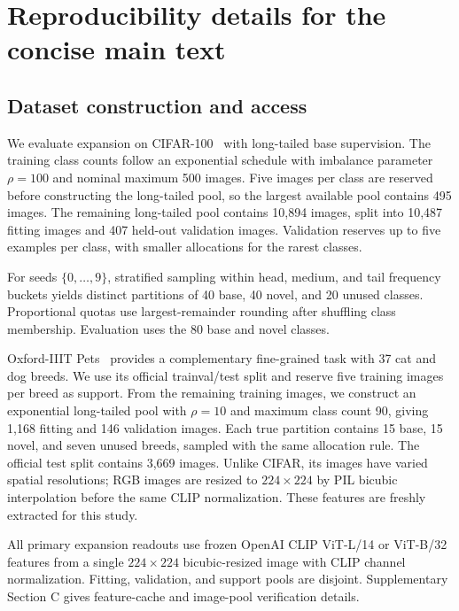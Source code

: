 \documentclass[preprint,review,12pt]{elsarticle}
\begin{document}
\FloatBarrier
\section{Reproducibility details for the concise main text}
\label{app:concisedetails}
\subsection{Dataset construction and access}

We evaluate expansion on CIFAR-100~\cite{krizhevsky2009cifar} with long-tailed base supervision. The training class counts follow an exponential schedule with imbalance parameter $\rho=100$ and nominal maximum 500 images. Five images per class are reserved before constructing the long-tailed pool, so the largest available pool contains 495 images. The remaining long-tailed pool contains 10,894 images, split into 10,487 fitting images and 407 held-out validation images. Validation reserves up to five examples per class, with smaller allocations for the rarest classes.

For seeds $\{0,\ldots,9\}$, stratified sampling within head, medium, and tail frequency buckets yields distinct partitions of 40 base, 40 novel, and 20 unused classes. Proportional quotas use largest-remainder rounding after shuffling class membership. Evaluation uses the 80 base and novel classes.

Oxford-IIIT Pets~\cite{parkhi2012cats} provides a complementary fine-grained task with 37 cat and dog breeds. We use its official trainval/test split and reserve five training images per breed as support. From the remaining training images, we construct an exponential long-tailed pool with $\rho=10$ and maximum class count 90, giving 1,168 fitting and 146 validation images. Each true partition contains 15 base, 15 novel, and seven unused breeds, sampled with the same allocation rule. The official test split contains 3,669 images. Unlike CIFAR, its images have varied spatial resolutions; RGB images are resized to $224\times224$ by PIL bicubic interpolation before the same CLIP normalization. These features are freshly extracted for this study.

All primary expansion readouts use frozen OpenAI CLIP ViT-L/14 or ViT-B/32 features from a single $224\times224$ bicubic-resized image with CLIP channel normalization. Fitting, validation, and support pools are disjoint. Supplementary Section C gives feature-cache and image-pool verification details.
\end{document}
